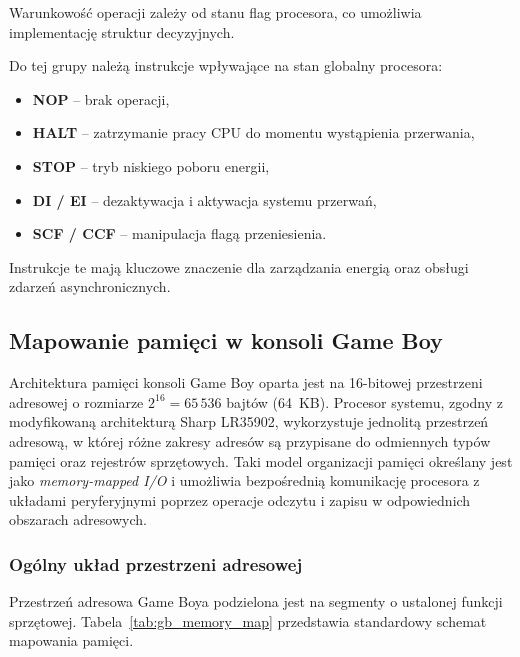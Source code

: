 \documentclass{article}
\begin{document}
Warunkowość operacji zależy od stanu flag procesora, co umożliwia implementację struktur decyzyjnych.

Do tej grupy należą instrukcje wpływające na stan globalny procesora:

\begin{itemize}
	\item \textbf{NOP} -- brak operacji,
	\item \textbf{HALT} -- zatrzymanie pracy CPU do momentu wystąpienia przerwania,
	\item \textbf{STOP} -- tryb niskiego poboru energii,
	\item \textbf{DI / EI} -- dezaktywacja i aktywacja systemu przerwań,
	\item \textbf{SCF / CCF} -- manipulacja flagą przeniesienia.
\end{itemize}

Instrukcje te mają kluczowe znaczenie dla zarządzania energią oraz obsługi zdarzeń asynchronicznych.


\subsection{Mapowanie pamięci w konsoli Game Boy}

Architektura pamięci konsoli Game Boy oparta jest na 16-bitowej przestrzeni adresowej o rozmiarze $2^{16} = 65\,536$ bajtów (64~KB). Procesor systemu, zgodny z modyfikowaną architekturą Sharp LR35902, wykorzystuje jednolitą przestrzeń adresową, w której różne zakresy adresów są przypisane do odmiennych typów pamięci oraz rejestrów sprzętowych. Taki model organizacji pamięci określany jest jako \emph{memory-mapped I/O} i umożliwia bezpośrednią komunikację procesora z układami peryferyjnymi poprzez operacje odczytu i zapisu w odpowiednich obszarach adresowych.

\subsubsection{Ogólny układ przestrzeni adresowej}

Przestrzeń adresowa Game Boya podzielona jest na segmenty o ustalonej funkcji sprzętowej. Tabela~\ref{tab:gb_memory_map} przedstawia standardowy schemat mapowania pamięci.
\end{document}
